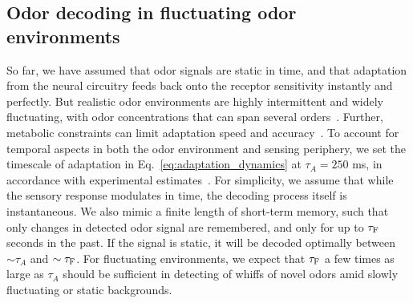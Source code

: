 \documentclass[9pt,twocolumn,twoside,lineno]{pnas-new}
\begin{document}
\subsection{Odor decoding in fluctuating odor environments}
So far, we have assumed that odor signals are static in time, and that adaptation from the neural circuitry feeds back onto the receptor sensitivity instantly and perfectly. But realistic odor environments are highly intermittent and widely fluctuating, with odor concentrations that can span several orders~\cite{celani}. Further, metabolic constraints can limit adaptation speed and accuracy~\cite{ESA}. To account for temporal aspects in both the odor environment and sensing periphery, we set the timescale of adaptation in Eq.~\ref{eq:adaptation_dynamics} at $\tau_A = 250$ ms, in accordance with experimental estimates~\cite{srinivas_elife}. For simplicity, we assume that while the sensory response modulates in time, the decoding process itself is instantaneous. We also mimic a finite length of short-term memory, such that only changes in detected odor signal are remembered, and  only for up to $\tau_{\textup {F}}$ seconds in the past. If the signal is static, it will be decoded optimally between $\sim\tau_A$ and $\sim\tau_{\textup{F}}$. For fluctuating environments, we expect that $\tau_{\textup{F}}$ a few times as large as $\tau_A$ should be sufficient in detecting of whiffs of novel odors amid slowly fluctuating or static backgrounds.

\end{document}
